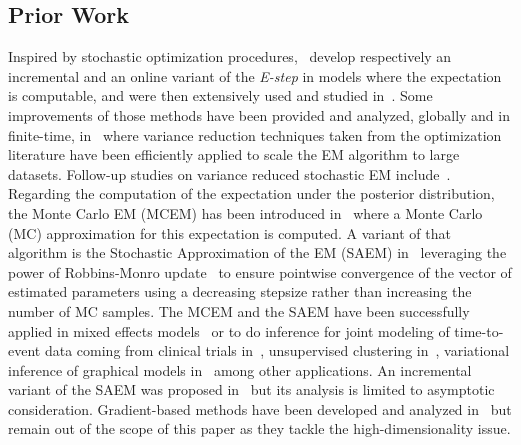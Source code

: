 \documentclass[12pt]{article}
\begin{document}
\subsection{Prior Work}
Inspired by stochastic optimization procedures,~\citet{neal1998view,cappe2009line} develop respectively an incremental and an online variant of the \textit{E-step} in models where the expectation is computable, and were then extensively used and studied in~\citet{nguyen2020mini, liang2009online,cappe2011online}.
Some improvements of those methods have been provided and analyzed, globally and in finite-time, in~\citet{karimi2019global} where variance reduction techniques taken from the optimization literature have been efficiently applied to scale the EM algorithm to large datasets. Follow-up studies on variance reduced stochastic EM include~\citet{fortem2020,fort2021geom}.
Regarding the computation of the expectation under the posterior distribution, the Monte Carlo EM (MCEM) has been introduced in~\citet{wei1990monte} where a Monte Carlo (MC) approximation for this expectation is computed. A variant of that algorithm is the Stochastic Approximation of the EM (SAEM) in~\citet{delyon1999} leveraging the power of Robbins-Monro update~\citep{robbins1951stochastic} to ensure pointwise convergence of the vector of estimated parameters using a decreasing stepsize rather than increasing the number of MC samples.
The MCEM and the SAEM have been successfully applied in mixed effects models~\citep{mcculloch1997maximum,hughes1999mixed,baey2016nonlinear} or to do inference for joint modeling of time-to-event data coming from clinical trials in~\citet{das2010Inferences}, unsupervised clustering in~\citet{ngChoice2003}, variational inference of graphical models in~\citet{BleiVariational2017} among other applications.
An incremental variant of the SAEM was proposed in~\citet{kuhn2019properties} but its analysis is limited to asymptotic consideration. 
Gradient-based methods have been developed and analyzed in~\citet{zhu2017high} but remain out of the scope of this paper as they tackle the high-dimensionality issue.
\end{document}
